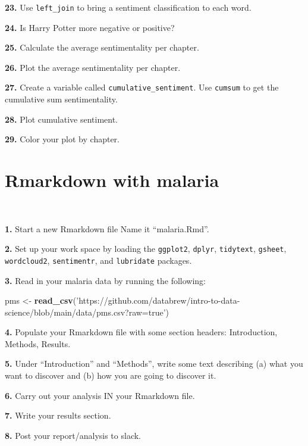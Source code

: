 \documentclass[]{book}
\newenvironment{Shaded}{\begin{snugshade}}{\end{snugshade}}
\newcommand{\KeywordTok}[1]{\textcolor[rgb]{0.13,0.29,0.53}{\textbf{#1}}}
\newcommand{\NormalTok}[1]{#1}
\newcommand{\StringTok}[1]{\textcolor[rgb]{0.31,0.60,0.02}{#1}}
\begin{document}
\textbf{23.} Use \texttt{left\_join} to bring a sentiment classification to each word.

\textbf{24.} Is Harry Potter more negative or positive?

\textbf{25.} Calculate the average sentimentality per chapter.

\textbf{26.} Plot the average sentimentality per chapter.

\textbf{27.} Create a variable called \texttt{cumulative\_sentiment}. Use \texttt{cumsum} to get the cumulative sum sentimentality.

\textbf{28.} Plot cumulative sentiment.

\textbf{29.} Color your plot by chapter.

\hypertarget{rmarkdown-with-malaria}{%
\chapter{Rmarkdown with malaria}\label{rmarkdown-with-malaria}}

~

\textbf{1.} Start a new Rmarkdown file Name it ``malaria.Rmd''.

\textbf{2.} Set up your work space by loading the \texttt{ggplot2}, \texttt{dplyr}, \texttt{tidytext}, \texttt{gsheet}, \texttt{wordcloud2}, \texttt{sentimentr}, and \texttt{lubridate} packages.

\textbf{3.} Read in your malaria data by running the following:

\begin{Shaded}
\begin{Highlighting}[]
\NormalTok{pms <-}\StringTok{ }\KeywordTok{read_csv}\NormalTok{(}\StringTok{'https://github.com/databrew/intro-to-data-science/blob/main/data/pms.csv?raw=true'}\NormalTok{)}
\end{Highlighting}
\end{Shaded}

\textbf{4.} Populate your Rmarkdown file with some section headers: Introduction, Methods, Results.

\textbf{5.} Under ``Introduction'' and ``Methods'', write some text describing (a) what you want to discover and (b) how you are going to discover it.

\textbf{6.} Carry out your analysis IN your Rmarkdown file.

\textbf{7.} Write your results section.

\textbf{8.} Post your report/analysis to slack.
\end{document}
